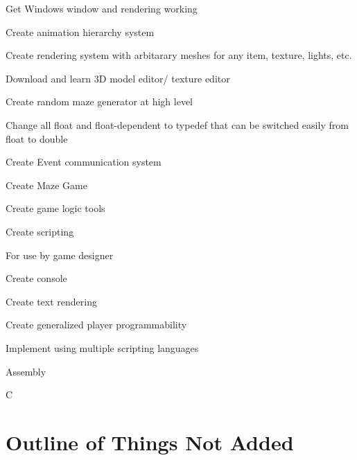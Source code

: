 \begin{DoxyItemize}
\item Get Windows window and rendering working
\item Create animation hierarchy system
\item Create rendering system with arbitarary meshes for any item, texture, lights, etc.
\item Download and learn 3D model editor/ texture editor
\item Create random maze generator at high level
\item Change all float and float-\/dependent to typedef that can be switched easily from float to double
\item Create Event communication system
\item Create Maze Game
\item Create game logic tools
\item Create scripting
\begin{DoxyItemize}
\item For use by game designer
\end{DoxyItemize}
\item Create console
\begin{DoxyItemize}
\item Create text rendering
\end{DoxyItemize}
\item Create generalized player programmability
\begin{DoxyItemize}
\item Implement using multiple scripting languages
\begin{DoxyItemize}
\item Assembly
\item C
\end{DoxyItemize}
\end{DoxyItemize}
\end{DoxyItemize}\hypertarget{index_outline}{}\section{Outline of Things Not Added}\label{index_outline}

